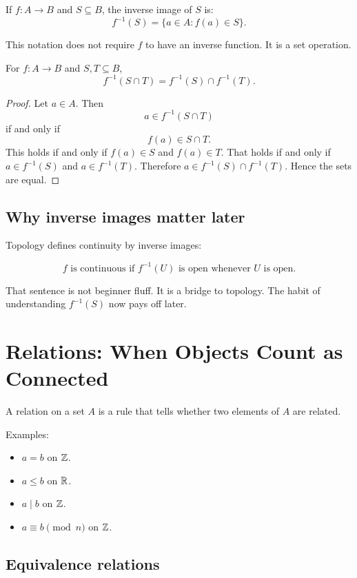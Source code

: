 \documentclass[11pt]{article}
\begin{document}
If $f:A\to B$ and $S\subseteq B$, the inverse image of $S$ is:
\[
f^{-1}(S)=\{a\in A:f(a)\in S\}.
\]

This notation does not require $f$ to have an inverse function. It is a set operation.

\begin{theorem}
For $f:A\to B$ and $S,T\subseteq B$,
\[
f^{-1}(S\cap T)=f^{-1}(S)\cap f^{-1}(T).
\]
\end{theorem}

\begin{proof}
Let $a\in A$. Then
\[
a\in f^{-1}(S\cap T)
\]
if and only if
\[
f(a)\in S\cap T.
\]
This holds if and only if $f(a)\in S$ and $f(a)\in T$. That holds if and only if $a\in f^{-1}(S)$ and $a\in f^{-1}(T)$. Therefore $a\in f^{-1}(S)\cap f^{-1}(T)$. Hence the sets are equal.
\end{proof}

\subsection{Why inverse images matter later}

Topology defines continuity by inverse images:

\[
f \text{ is continuous if } f^{-1}(U) \text{ is open whenever } U \text{ is open.}
\]

That sentence is not beginner fluff. It is a bridge to topology. The habit of understanding $f^{-1}(S)$ now pays off later.

\newpage
\section{Relations: When Objects Count as Connected}

A relation on a set $A$ is a rule that tells whether two elements of $A$ are related.

Examples:

\begin{itemize}
\item $a=b$ on $\mathbb{Z}$.
\item $a\leq b$ on $\mathbb{R}$.
\item $a\mid b$ on $\mathbb{Z}$.
\item $a\equiv b\pmod n$ on $\mathbb{Z}$.
\end{itemize}

\subsection{Equivalence relations}
\end{document}
